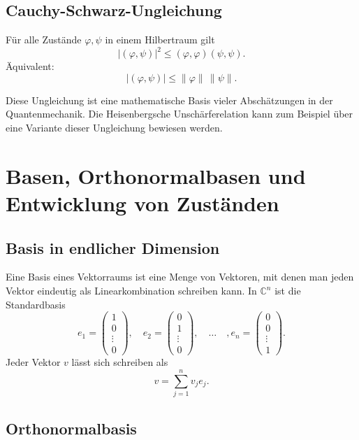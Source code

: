 \subsection{Cauchy-Schwarz-Ungleichung}

\begin{formulabox}
Für alle Zustände $\varphi,\psi$ in einem Hilbertraum gilt
\[
    |(\varphi,\psi)|^2\le (\varphi,\varphi)(\psi,\psi).
\]
Äquivalent:
\[
    |(\varphi,\psi)|\le \|\varphi\|\,\|\psi\|.
\]
\end{formulabox}

Diese Ungleichung ist eine mathematische Basis vieler Abschätzungen in der Quantenmechanik. Die Heisenbergsche Unschärferelation kann zum Beispiel über eine Variante dieser Ungleichung bewiesen werden.

\section{Basen, Orthonormalbasen und Entwicklung von Zuständen}

\subsection{Basis in endlicher Dimension}

Eine Basis eines Vektorraums ist eine Menge von Vektoren, mit denen man jeden Vektor eindeutig als Linearkombination schreiben kann. In $\mathbb{C}^n$ ist die Standardbasis
\[
    e_1=\begin{pmatrix}1\\0\\\vdots\\0\end{pmatrix},
    \quad
    e_2=\begin{pmatrix}0\\1\\\vdots\\0\end{pmatrix},
    \quad \dots \quad,
    e_n=\begin{pmatrix}0\\0\\\vdots\\1\end{pmatrix}.
\]
Jeder Vektor $v$ lässt sich schreiben als
\[
    v=\sum_{j=1}^{n}v_j e_j.
\]

\subsection{Orthonormalbasis}

